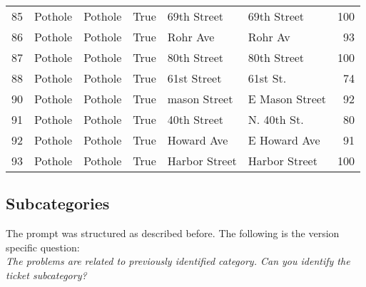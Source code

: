 \begin{center}
\begin{tabular}{lllrllr}
            85 & Pothole   & Pothole   & True & 69th Street   & 69th Street    & 100      \\
            86 & Pothole   & Pothole   & True & Rohr Ave      & Rohr Av        & 93       \\
            87 & Pothole   & Pothole   & True & 80th Street   & 80th Street    & 100      \\
            88 & Pothole   & Pothole   & True & 61st Street   & 61st St.       & 74       \\
            90 & Pothole   & Pothole   & True & mason Street  & E Mason Street & 92       \\
            91 & Pothole   & Pothole   & True & 40th Street   & N. 40th St.    & 80       \\
            92 & Pothole   & Pothole   & True & Howard Ave    & E Howard Ave   & 91       \\
            93 & Pothole   & Pothole   & True & Harbor Street & Harbor Street  & 100      \\
            \bottomrule
      \end{tabular}
\end{center}

\subsection{Subcategories}
The prompt was structured as described before. The following is the version specific question:\\

\textit{The problems are related to previously identified category. Can you identify the ticket subcategory?}\\


